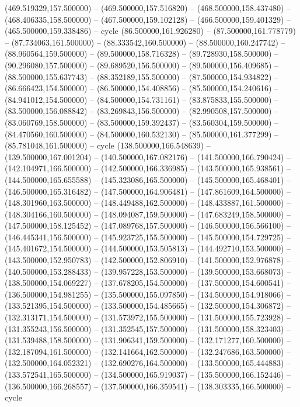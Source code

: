 (469.519329,157.500000) -- (469.500000,157.516820) -- (468.500000,158.437480) -- (468.406335,158.500000) -- (467.500000,159.102128) -- (466.500000,159.401329) -- (465.500000,159.338486) -- cycle
   (86.500000,161.926280) -- (87.500000,161.778779) -- (87.734063,161.500000) -- (88.333542,160.500000) -- (88.500000,160.247742) -- (88.960564,159.500000) -- (89.500000,158.716328) -- (89.728930,158.500000) -- (90.296080,157.500000) -- (89.689520,156.500000) -- (89.500000,156.409685) -- (88.500000,155.637743) -- (88.352189,155.500000) -- (87.500000,154.934822) -- (86.666423,154.500000) -- (86.500000,154.408856) -- (85.500000,154.240616) -- (84.941012,154.500000) -- (84.500000,154.731161) -- (83.875833,155.500000) -- (83.500000,156.088842) -- (83.269843,156.500000) -- (82.990508,157.500000) -- (83.060769,158.500000) -- (83.500000,159.392437) -- (83.560304,159.500000) -- (84.470560,160.500000) -- (84.500000,160.532130) -- (85.500000,161.377299) -- (85.781048,161.500000) -- cycle
   (138.500000,166.548639) -- (139.500000,167.001204) -- (140.500000,167.082176) -- (141.500000,166.790424) -- (142.104971,166.500000) -- (142.500000,166.336985) -- (143.500000,165.938561) -- (144.500000,165.655588) -- (145.323086,165.500000) -- (145.500000,165.468401) -- (146.500000,165.316482) -- (147.500000,164.906481) -- (147.861609,164.500000) -- (148.301960,163.500000) -- (148.449488,162.500000) -- (148.433887,161.500000) -- (148.304166,160.500000) -- (148.094087,159.500000) -- (147.683249,158.500000) -- (147.500000,158.125452) -- (147.089768,157.500000) -- (146.500000,156.566100) -- (146.445341,156.500000) -- (145.923725,155.500000) -- (145.500000,154.729725) -- (145.401672,154.500000) -- (144.500000,153.505813) -- (144.492710,153.500000) -- (143.500000,152.950783) -- (142.500000,152.806910) -- (141.500000,152.976878) -- (140.500000,153.288433) -- (139.957228,153.500000) -- (139.500000,153.668073) -- (138.500000,154.069227) -- (137.678205,154.500000) -- (137.500000,154.600541) -- (136.500000,154.981255) -- (135.500000,155.097850) -- (134.500000,154.918066) -- (133.521395,154.500000) -- (133.500000,154.485665) -- (132.500000,154.306872) -- (132.313171,154.500000) -- (131.573972,155.500000) -- (131.500000,155.723928) -- (131.355243,156.500000) -- (131.352545,157.500000) -- (131.500000,158.323403) -- (131.539488,158.500000) -- (131.906341,159.500000) -- (132.171277,160.500000) -- (132.187094,161.500000) -- (132.141664,162.500000) -- (132.247686,163.500000) -- (132.500000,164.052321) -- (132.690276,164.500000) -- (133.500000,165.444883) -- (133.572541,165.500000) -- (134.500000,165.919037) -- (135.500000,166.152446) -- (136.500000,166.268557) -- (137.500000,166.359541) -- (138.303335,166.500000) -- cycle
